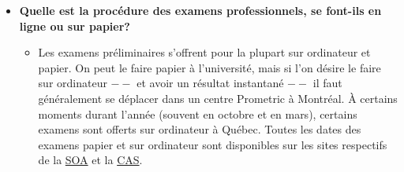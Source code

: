 \begin{itemize}
\begin{itemize}
	\end{itemize}
	\item \textbf{Quelle est la procédure des examens professionnels, se font-ils en ligne ou sur papier?}
	\begin{itemize}
	\item Les examens préliminaires s'offrent pour la plupart sur ordinateur et papier. On peut le faire papier à l'université, mais si l'on désire le faire sur ordinateur $--$ et avoir un résultat instantané $--$ il faut généralement se déplacer dans un centre Prometric à Montréal. À certains moments durant l'année (souvent en octobre et en mars), certains examens sont offerts sur ordinateur à Québec. Toutes les dates des examens papier et sur ordinateur sont disponibles sur les sites respectifs de la \href{https://www.soa.org/Education/Exam-Req/Exam-Day-Info/edu-2017-cbt-test-schedule.aspx}{SOA} et la \href{http://www.casact.org/admissions/exams/}{CAS}.
	\end{itemize}
\end{itemize}
